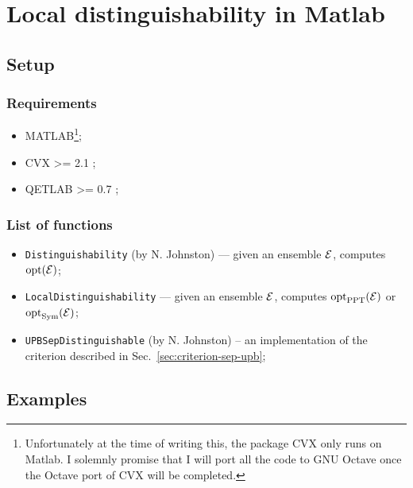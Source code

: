 \chapter{Local distinguishability in Matlab}
\label{chap:AppendixA}


\section*{Setup}
\subsection*{Requirements}

\begin{itemize}
    \item MATLAB\footnote{Unfortunately at the time of writing this, 
        the package CVX only runs on Matlab. I solemnly promise that I will port
        all the code to GNU Octave once the Octave port of CVX will be completed.};
    \item CVX  \textgreater= 2.1 \cite{cvx};
    \item QETLAB \textgreater= 0.7 \cite{Johnston2015};
\end{itemize}

\subsection*{List of functions}

\begin{itemize}
    \item \texttt{Distinguishability} (by N. Johnston) ---
        given an ensemble $\mathcal{E}$, computes $\operatorname{opt}(\mathcal{E})$;
    \item \texttt{LocalDistinguishability} ---
        given an ensemble $\mathcal{E}$, computes $\operatorname{opt}_{\mathrm{PPT}}(\mathcal{E})$ or $\operatorname{opt}_{\mathrm{Sym}}(\mathcal{E})$;
    \item \texttt{UPBSepDistinguishable} (by N. Johnston) -- an implementation of
    the criterion described in Sec.~\ref{sec:criterion-sep-upb};
\end{itemize}

\sloppy
{}
\setlength{\parindent}{0pt}

\section*{Examples}


